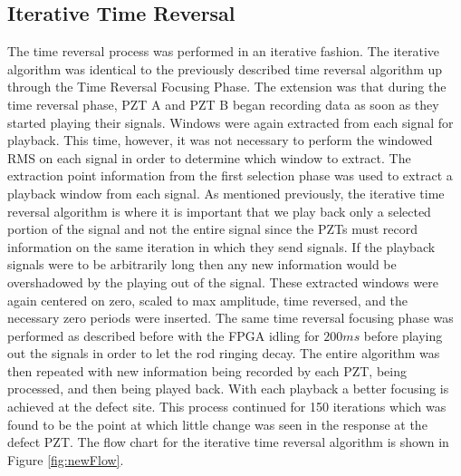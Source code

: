\subsection{Iterative Time Reversal}
The time reversal process was performed in an iterative fashion. The iterative algorithm was identical to the previously described time reversal algorithm up through the Time Reversal Focusing Phase. The extension was that during the time reversal phase, PZT A and PZT B began recording data as soon as they started playing their signals. Windows were again extracted from each signal for playback. This time, however, it was not necessary to perform the windowed RMS on each signal in order to determine which window to extract. The extraction point information from the first selection phase was used to extract a playback window from each signal. As mentioned previously, the iterative time reversal algorithm is where it is important that we play back only a selected portion of the signal and not the entire signal since the PZTs must record information on the same iteration in which they send signals. If the playback signals were to be arbitrarily long then any new information would be overshadowed by the playing out of the signal. These extracted windows were again centered on zero, scaled to max amplitude, time reversed, and the necessary zero periods were inserted. The same time reversal focusing phase was performed as described before with the FPGA idling for $200ms$ before playing out the signals in order to let the rod ringing decay. The entire algorithm was then repeated with new information being recorded by each PZT, being processed, and then being played back. With each playback a better focusing is achieved at the defect site. This process continued for 150 iterations which was found to be the point at which little change was seen in the response at the defect PZT. The flow chart for the iterative time reversal algorithm is shown in Figure \ref{fig:newFlow}.

